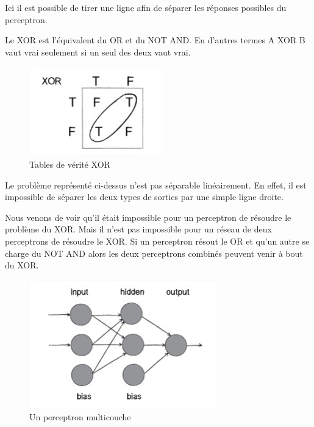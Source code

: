 \documentclass[a4paper, 12pt]{article} %
\begin{document}
Ici il est possible de tirer une ligne afin de séparer les réponses possibles du perceptron.

Le XOR est l’équivalent du OR et du NOT AND. En d’autres termes A XOR B vaut vrai seulement si un seul des deux vaut vrai.

\begin{figure}[!h]%
	\begin{center} 
		\includegraphics[width=0.60\columnwidth]{images/xor.jpg}%
		\caption{Tables de vérité XOR}%
	\end{center}
\end{figure}

Le problème représenté ci-dessus n’est pas séparable linéairement. En effet, il est impossible de séparer les deux types de sorties par une simple ligne droite.

Nous venons de voir qu’il était impossible pour un perceptron de résoudre le problème du XOR. Mais il n’est pas impossible pour un réseau de deux perceptrons de résoudre le XOR. Si un perceptron résout le OR et qu’un autre se charge du NOT AND alors les deux perceptrons combinés peuvent venir à bout du XOR.

\begin{figure}[!h]%
	\begin{center} 
		\includegraphics[width=0.60\columnwidth]{images/perceptronmulticouche.jpg}%
		\caption{Un perceptron multicouche}%
	\end{center}
\end{figure}
\end{document}
